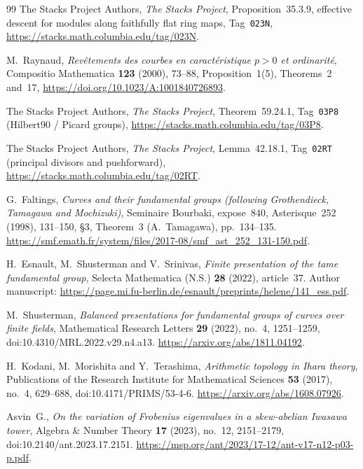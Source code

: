 \documentclass[11pt,a4paper]{article}
\begin{document}
\begin{thebibliography}{99}
The Stacks Project Authors, \emph{The Stacks Project},
Proposition~35.3.9, effective descent for modules along
faithfully flat ring maps, Tag~\texttt{023N},
\url{https://stacks.math.columbia.edu/tag/023N}.

M.~Raynaud, \emph{Rev\^etements des courbes en caract\'eristique
$p>0$ et ordinarit\'e}, Compositio Mathematica \textbf{123}
(2000), 73--88, Proposition~1(5), Theorems~2 and~17,
\url{https://doi.org/10.1023/A:1001840726893}.

The Stacks Project Authors,
\emph{The Stacks Project}, Theorem~59.24.1,
Tag~\texttt{03P8} (Hilbert90 / Picard groups),
\url{https://stacks.math.columbia.edu/tag/03P8}.

The Stacks Project Authors,
\emph{The Stacks Project}, Lemma~42.18.1,
Tag~\texttt{02RT} (principal divisors and pushforward),
\url{https://stacks.math.columbia.edu/tag/02RT}.

G.~Faltings, \emph{Curves and their fundamental groups
(following Grothendieck, Tamagawa and Mochizuki)},
Seminaire Bourbaki, expose~840, Asterisque~252 (1998), 131--150,
\S3, Theorem~3 (A.~Tamagawa), pp.~134--135.
\url{https://smf.emath.fr/system/files/2017-08/smf_ast_252_131-150.pdf}.

H.~Esnault, M.~Shusterman and V.~Srinivas,
\emph{Finite presentation of the tame fundamental group},
Selecta Mathematica (N.S.) \textbf{28} (2022), article~37.
Author manuscript:
\url{https://page.mi.fu-berlin.de/esnault/preprints/helene/141_ess.pdf}.

M.~Shusterman,
\emph{Balanced presentations for fundamental groups of curves over finite fields},
Mathematical Research Letters \textbf{29} (2022), no.~4, 1251--1259,
doi:10.4310/MRL.2022.v29.n4.a13.
\url{https://arxiv.org/abs/1811.04192}.

H.~Kodani, M.~Morishita and Y.~Terashima,
\emph{Arithmetic topology in Ihara theory},
Publications of the Research Institute for Mathematical Sciences
\textbf{53} (2017), no.~4, 629--688,
doi:10.4171/PRIMS/53-4-6.
\url{https://arxiv.org/abs/1608.07926}.

Asvin~G.,
\emph{On the variation of Frobenius eigenvalues in a skew-abelian Iwasawa tower},
Algebra \& Number Theory \textbf{17} (2023), no.~12, 2151--2179,
doi:10.2140/ant.2023.17.2151.
\url{https://msp.org/ant/2023/17-12/ant-v17-n12-p03-p.pdf}.


\end{thebibliography}
\end{document}
